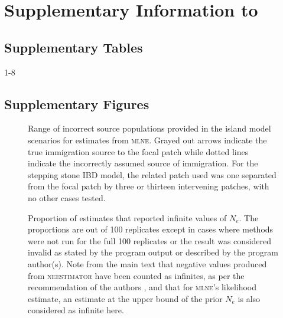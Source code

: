 \chapter{Supplementary Information to }

\section{Supplementary Tables}

1-8


\section{Supplementary Figures}




\begin{figure}[h!]
\centering
{}
\caption[Range of incorrect source populations provided in the island model scenarios.]{Range of incorrect source populations provided in the island model scenarios for estimates from \textsc{mlne}. Grayed out arrows indicate the true immigration source to the focal patch while dotted lines indicate the incorrectly assumed source of immigration. For the stepping stone IBD model, the related patch used was one separated from the focal patch by three or thirteen intervening patches, with no other cases tested.}
\label{fig:supp_demog}
\end{figure}


\begin{figure}[h!]
\centering
{}
\caption[Proportion of estimates that reported infinite values of $N_e$.]{Proportion of estimates that reported infinite values of $N_e$. The proportions are out of 100 replicates except in cases where methods were not run for the full 100 replicates or the result was considered invalid as stated by the program output or described by the program author(s). Note from the main text that negative values produced from \textsc{neestimator} have been counted as infinites, as per the recommendation of the authors \citep{Do:2014}, and that for \textsc{mlne}'s likelihood estimate, an estimate at the upper bound of the prior $N_e$ is also considered as infinite here.}
\label{fig:supp_propinf}
\end{figure}


